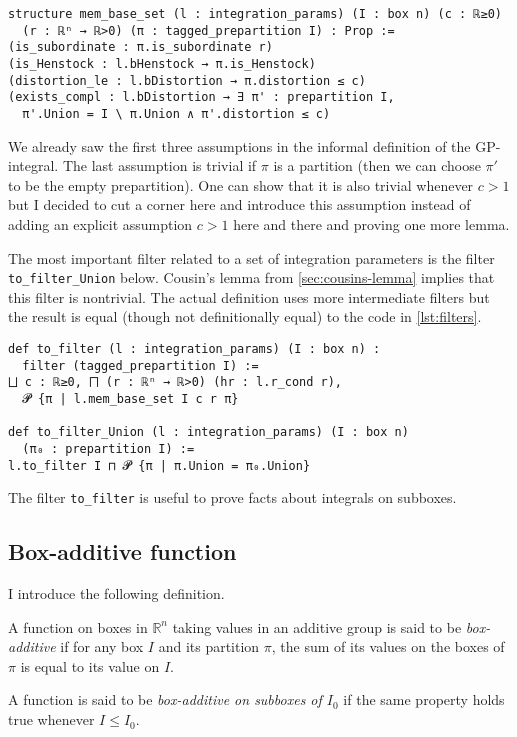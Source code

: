 \documentclass[a4paper, UKenglish,cleveref, autoref, thm-restate]{lipics-v2021}
\newcommand{\bbR}{\mathbb{R}}
\begin{document}
\begin{lstlisting}[caption={Basis sets used to define filters related to integration parameters.},label=lst:mem-base-set]
structure mem_base_set (l : integration_params) (I : box n) (c : ℝ≥0)
  (r : ℝⁿ → ℝ>0) (π : tagged_prepartition I) : Prop :=
(is_subordinate : π.is_subordinate r)
(is_Henstock : l.bHenstock → π.is_Henstock)
(distortion_le : l.bDistortion → π.distortion ≤ c)
(exists_compl : l.bDistortion → ∃ π' : prepartition I,
  π'.Union = I \ π.Union ∧ π'.distortion ≤ c)
\end{lstlisting}

We already saw the first three assumptions in the informal definition
of the GP-integral. The last assumption is trivial if \(\pi\) is a
partition (then we can choose \(\pi'\) to be the empty
prepartition). One can show that it is also trivial whenever \(c>1\)
but I decided to cut a corner here and introduce this assumption
instead of adding an explicit assumption \(c>1\) here and there and
proving one more lemma.

The most important filter related to a set of integration parameters
is the filter \lstinline=to_filter_Union= below. Cousin's lemma from
\autoref{sec:cousins-lemma} implies that this filter is
nontrivial. The actual definition uses more intermediate filters but
the result is equal (though not definitionally equal) to the code in
\autoref{lst:filters}.

\begin{lstlisting}[caption=Filters defined by a set of integration parameters and a box,label=lst:filters]
def to_filter (l : integration_params) (I : box n) :
  filter (tagged_prepartition I) :=
⨆ c : ℝ≥0, ⨅ (r : ℝⁿ → ℝ>0) (hr : l.r_cond r),
  𝓟 {π | l.mem_base_set I c r π}

def to_filter_Union (l : integration_params) (I : box n)
  (π₀ : prepartition I) :=
l.to_filter I ⊓ 𝓟 {π | π.Union = π₀.Union}
\end{lstlisting}

The filter \lstinline=to_filter= is useful to prove facts about
integrals on subboxes.

\subsection{Box-additive function}%
\label{sec:box-addit-funct}

I introduce the following definition.

\begin{definition}
  A function on boxes in \(\bbR^{n}\) taking values in an additive
  group is said to be \emph{box-additive} if for any box \(I\) and its
  partition \(\pi\), the sum of its values on the boxes of \(\pi\) is
  equal to its value on \(I\).

  A function is said to be \emph{box-additive on subboxes of
    \(I_{0}\)} if the same property holds true whenever \(I\le I_{0}\).
\end{definition}
\end{document}
